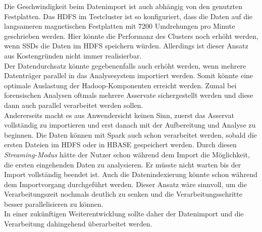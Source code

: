 \noindent
Die Geschwindigkeit beim Datenimport ist auch abhängig von den genutzten Festplatten. Das HDFS im Testcluster ist so konfiguriert, dass die Daten auf die langsameren magnetischen Festplatten mit 7200 Umdrehungen pro Minute geschrieben werden. 
Hier könnte die Performanz des Clusters noch erhöht werden, wenn SSDs die Daten im HDFS speichern würden. Allerdings ist dieser Ansatz aus Kostengründen nicht immer realisierbar.\\

\noindent
Der Datendurchsatz könnte gegebenenfalls auch erhöht werden, wenn mehrere Datenträger parallel in das Analysesystem importiert werden. 
Somit könnte eine optimale Auslastung der Hadoop-Komponenten erreicht werden. Zumal bei forensischen Analysen oftmals mehrere Asservate sichergestellt werden und diese dann auch parallel verarbeitet werden sollen.\\

\noindent
Andererseits macht es aus Anwendersicht keinen Sinn, zuerst das Asservat vollständig zu importieren und erst danach mit der Aufbereitung und Analyse zu beginnen. Die Daten können mit Spark auch schon verarbeitet werden, sobald die ersten Dateien im HDFS oder in HBASE gespeichert werden. Durch diesen \textit{Streaming-Modus} hätte der Nutzer schon während dem Import die Möglichkeit, die ersten eingehenden Daten zu analysieren. Er müsste nicht warten bis der Import vollständig beendet ist. Auch die Datenindexierung könnte schon während dem Importvorgang durchgeführt werden. Dieser Ansatz wäre sinnvoll, um die Verarbeitungszeit nochmals deutlich zu senken und die Verarbeitungsschritte besser parallelisieren zu können.\\
In einer zukünftigen Weiterentwicklung sollte daher der Datenimport und die Verarbeitung dahingehend überarbeitet werden.